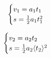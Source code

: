 \begin{equation} \begin{cases}v_{1}=a_1 t_{1}\\ s=\frac{1}{2}a_{1} t_{1}^{2}\\ \end{cases}\ \\  \end{equation}

\begin{equation} \begin{cases}v_{2}=a_2 t_{2}\\ s=\frac{1}{2}a_{2}\langle t_{2}\rangle^{2}\\ \end{cases}\ \\  \end{equation}